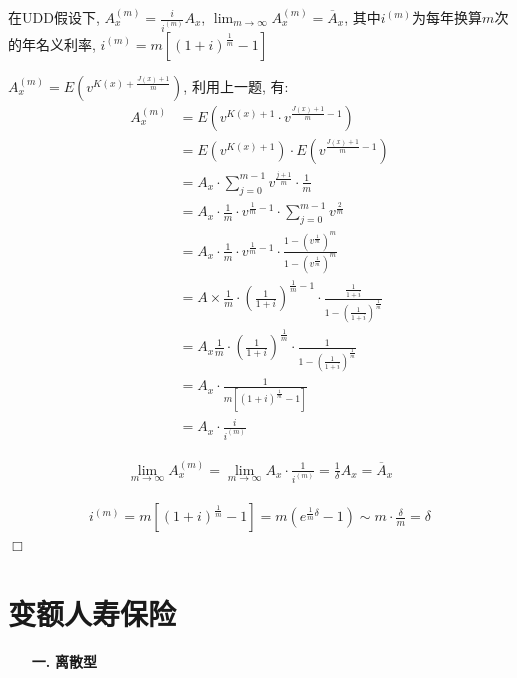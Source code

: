\documentclass[a4paper,10pt]{ctexbook}
\newcommand{\hei}{\CJKfamily{hei}}      %
\def\qed{\hfill$\Box$\medskip}
\begin{document}
\begin{proposition}
    在UDD假设下, $A_{x}^{(m)}=\frac{i}{i^{(m)}}A_{x}$, $\lim_{m\to\infty}A_{x}^{(m)}=\overline{A}_{x}$, 其中$i^{(m)}$为每年换算$m$次的年名义利率, $i^{(m)}=m[(1+i)^{\frac{1}{m}}-1]$
\end{proposition}

\proof
$A_{x}^{(m)}=E(v^{K(x)+\frac{J(x)+1}{m}})$, 利用上一题, 有: \newline
\begin{align*}
    A_{x}^{(m)} & =E(v^{K(x)+1}\cdot v^{\frac{J(x)+1}{m}-1})                                                                        \\
                & = E(v^{K(x)+1})\cdot E(v^{\frac{J(x)+1}{m}-1})                                                                    \\
                & =A_{x}\cdot\sum_{j=0}^{m-1}v^{\frac{j+1}{m}}\cdot\frac{1}{m}                                                      \\
                & =A_{x}\cdot\frac{1}{m}\cdot v^{\frac{1}{m}-1}\cdot\sum_{j=0}^{m-1}v^{\frac{2}{m}}                                 \\
                & =A_{x}\cdot\frac{1}{m}\cdot v^{\frac{1}{m}-1}\cdot\frac{1-(v^{\frac{1}{m}})^{m}}{1-(v^{\frac{1}{m}})^{m}}         \\
                & =A\times\frac{1}{m}\cdot(\frac{1}{1+i})^{\frac{1}{m}-1}\cdot\frac{\frac{1}{1+i}}{1-(\frac{1}{1+i})^{\frac{1}{m}}} \\
                & =A_{x}\frac{1}{m}\cdot(\frac{1}{1+i})^{\frac{1}{m}}\cdot\frac{1}{1-(\frac{1}{1+i})^{\frac{1}{m}}}                 \\
                & =A_{x}\cdot\frac{1}{m[(1+i)^{\frac{1}{m}}-1]}                                                                     \\
                & =A_{x}\cdot\frac{i}{i^{(m)}}
\end{align*}

\begin{align*}
    \lim_{m\to\infty}A_{x}^{(m)}=\lim_{m\to\infty}A_{x}\cdot\frac{1}{i^{(m)}}=\frac{1}{\delta}A_{x}=\overline{A}_{x}
\end{align*}

\begin{align*}
    i^{(m)}=m[(1+i)^{\frac{1}{m}}-1]=m(e^{\frac{1}{m}\delta}-1)\sim m\cdot\frac{\delta}{m}=\delta
\end{align*}
\qed

\section{变额人寿保险}
\begin{itemize}
    \item[{\bf\hei 一.}]{\bf\hei 离散型}
\end{itemize}
\end{document}
